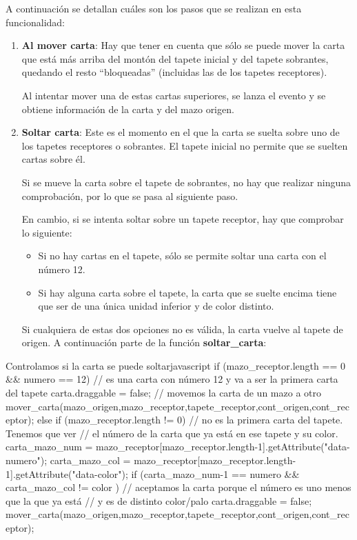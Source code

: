 \documentclass{\ClassPath/viu-tfm-template}
\begin{document}
A continuación se detallan cuáles son los pasos que se realizan en esta funcionalidad:

\vspace{-1em}
\begin{enumerate}
    \item \textbf{Al mover carta}: Hay que tener en cuenta que sólo se puede mover la carta que está más arriba del montón del tapete inicial y del tapete sobrantes, quedando el resto “bloqueadas” (incluidas las de los tapetes receptores).

    Al intentar mover una de estas cartas superiores, se lanza el evento y se obtiene información de la carta y del mazo origen.

    \item \textbf{Soltar carta}: Este es el momento en el que la carta se suelta sobre uno de los tapetes receptores o sobrantes. El tapete inicial no permite que se suelten cartas sobre él.

    Si se mueve la carta sobre el tapete de sobrantes, no hay que realizar ninguna comprobación, por lo que se pasa al siguiente paso.

    En cambio, si se intenta soltar sobre un tapete receptor, hay que comprobar lo siguiente:
        \begin{itemize}
            \item Si no hay cartas en el tapete, sólo se permite soltar una carta con el número 12.
            \item Si hay alguna carta sobre el tapete, la carta que se suelte encima tiene que ser de una única unidad inferior y de color distinto.
        \end{itemize}
    Si cualquiera de estas dos opciones no es válida, la carta vuelve al tapete de origen. A continuación parte de la función \textbf{soltar\_carta}:
\end{enumerate}
\vspace{-0.5em}

\begin{mycode}{Controlamos si la carta se puede soltar}{javascript}{{\footnotesize }}
if (mazo_receptor.length == 0 && numero == 12){
  // es una carta con número 12 y va a ser la primera carta del tapete
  carta.draggable = false;
  // movemos la carta de un mazo a otro
  mover_carta(mazo_origen,mazo_receptor,tapete_receptor,cont_origen,cont_receptor);
} else if (mazo_receptor.length != 0) {
  // no es la primera carta del tapete. Tenemos que ver
  // el número de la carta que ya está en ese tapete y su color.
  carta_mazo_num = mazo_receptor[mazo_receptor.length-1].getAttribute("data-numero");
  carta_mazo_col = mazo_receptor[mazo_receptor.length-1].getAttribute("data-color");
  if (carta_mazo_num-1 == numero && carta_mazo_col != color ) {
    // aceptamos la carta porque el número es uno menos que la que ya está
    // y es de distinto color/palo
    carta.draggable = false;
    mover_carta(mazo_origen,mazo_receptor,tapete_receptor,cont_origen,cont_receptor);
  }
}
\end{mycode}
\end{document}
